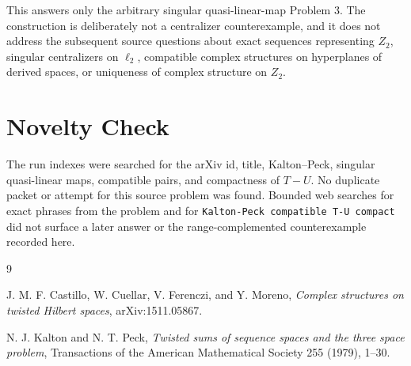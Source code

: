 \documentclass[11pt]{article}
\begin{document}
This answers only the arbitrary singular quasi-linear-map Problem 3. The
construction is deliberately not a centralizer counterexample, and it does not
address the subsequent source questions about exact sequences representing
$Z_2$, singular centralizers on $\ell_2$, compatible complex structures on
hyperplanes of derived spaces, or uniqueness of complex structure on $Z_2$.

\section*{Novelty Check}

The run indexes were searched for the arXiv id, title, Kalton--Peck,
singular quasi-linear maps, compatible pairs, and compactness of $T-U$. No
duplicate packet or attempt for this source problem was found. Bounded web
searches for exact phrases from the problem and for
\texttt{Kalton-Peck compatible T-U compact} did not surface a later answer or
the range-complemented counterexample recorded here.

\begin{thebibliography}{9}

J. M. F. Castillo, W. Cuellar, V. Ferenczi, and Y. Moreno,
\emph{Complex structures on twisted Hilbert spaces},
arXiv:1511.05867.

N. J. Kalton and N. T. Peck,
\emph{Twisted sums of sequence spaces and the three space problem},
Transactions of the American Mathematical Society 255 (1979), 1--30.

\end{thebibliography}
\end{document}
